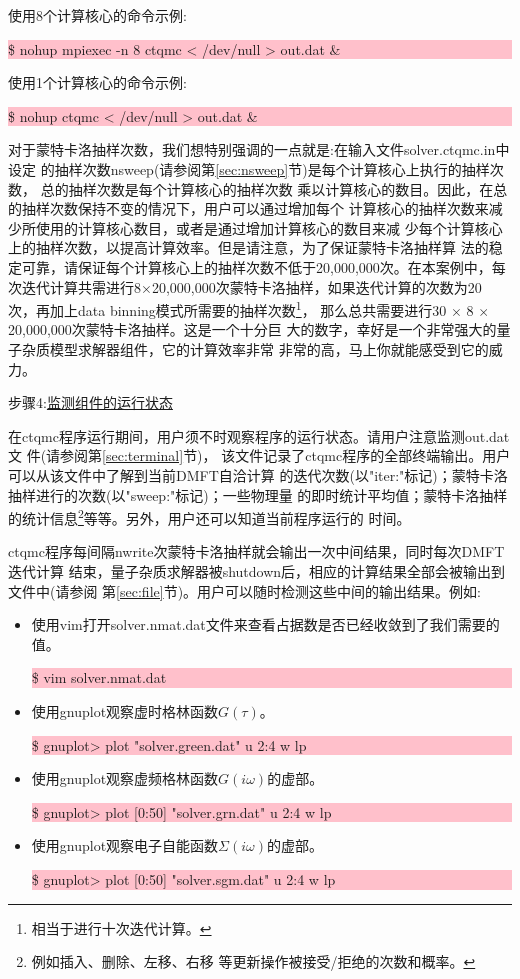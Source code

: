 使用8个计算核心的命令示例:

\noindent\colorbox{pink}{\parbox[r]{\linewidth}{\quad \$ nohup mpiexec -n 8 ctqmc < /dev/null >  out.dat \&}}

使用1个计算核心的命令示例:

\noindent\colorbox{pink}{\parbox[r]{\linewidth}{\quad \$ nohup ctqmc < /dev/null >  out.dat \&}}

对于蒙特卡洛抽样次数，我们想特别强调的一点就是:在输入文件solver.ctqmc.in中设定
的抽样次数nsweep(请参阅第\ref{sec:nsweep}节)是每个计算核心上执行的抽样次数，
总的抽样次数是每个计算核心的抽样次数
乘以计算核心的数目。因此，在总的抽样次数保持不变的情况下，用户可以通过增加每个
计算核心的抽样次数来减少所使用的计算核心数目，或者是通过增加计算核心的数目来减
少每个计算核心上的抽样次数，以提高计算效率。但是请注意，为了保证蒙特卡洛抽样算
法的稳定可靠，请保证每个计算核心上的抽样次数不低于20,000,000次。在本案例中，每
次迭代计算共需进行8$\times$20,000,000次蒙特卡洛抽样，如果迭代计算的次数为20
次，再加上data binning模式所需要的抽样次数\footnote{相当于进行十次迭代计算。}，
那么总共需要进行30 $\times$ 8 $\times$ 20,000,000次蒙特卡洛抽样。这是一个十分巨
大的数字，幸好{\azalea}是一个非常强大的量子杂质模型求解器组件，它的计算效率非常
非常的高，马上你就能感受到它的威力。

步骤4:\underline{监测{\azalea}组件的运行状态}

在ctqmc程序运行期间，用户须不时观察程序的运行状态。请用户注意监测out.dat文
件(请参阅第\ref{sec:terminal}节)，
该文件记录了ctqmc程序的全部终端输出。用户可以从该文件中了解到当前DMFT自洽计算
的迭代次数(以"iter:"标记)；蒙特卡洛抽样进行的次数(以"sweep:"标记)；一些物理量
的即时统计平均值；蒙特卡洛抽样的统计信息\footnote{例如插入、删除、左移、右移
等更新操作被接受/拒绝的次数和概率。}等等。另外，用户还可以知道当前程序运行的
时间。

ctqmc程序每间隔nwrite次蒙特卡洛抽样就会输出一次中间结果，同时每次DMFT迭代计算
结束，量子杂质求解器被shutdown后，相应的计算结果全部会被输出到文件中(请参阅
第\ref{sec:file}节)。用户可以随时检测这些中间的输出结果。例如:

\begin{itemize}
\item 使用vim打开solver.nmat.dat文件来查看占据数是否已经收敛到了我们需要的值。

\noindent\colorbox{pink}{\parbox[r]{\linewidth}{\quad \$ vim solver.nmat.dat }}

\item 使用gnuplot观察虚时格林函数$G(\tau)$。

\noindent\colorbox{pink}{\parbox[r]{\linewidth}{\quad \$ gnuplot> plot "solver.green.dat" u 2:4 w lp }}

\item 使用gnuplot观察虚频格林函数$G(i\omega)$的虚部。

\noindent\colorbox{pink}{\parbox[r]{\linewidth}{\quad \$ gnuplot> plot  [0:50] "solver.grn.dat" u 2:4 w lp }}

\item 使用gnuplot观察电子自能函数$\Sigma(i\omega)$的虚部。

\noindent\colorbox{pink}{\parbox[r]{\linewidth}{\quad \$ gnuplot> plot  [0:50] "solver.sgm.dat" u 2:4 w lp }}
\end{itemize}

